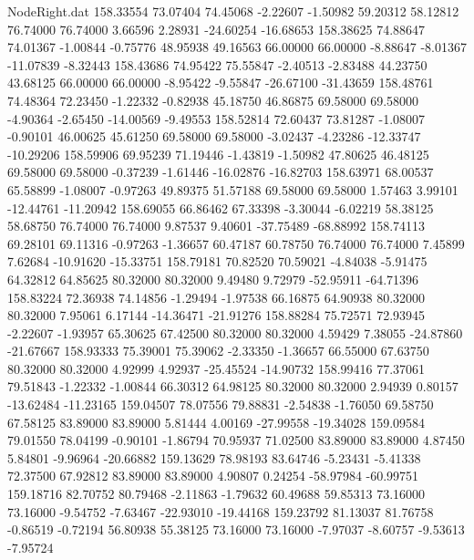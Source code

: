 \begin{filecontents}{NodeRight.dat}
 158.33554   73.07404   74.45068    -2.22607   -1.50982   59.20312   58.12812   76.74000   76.74000    3.66596    2.28931  -24.60254  -16.68653
 158.38625   74.88647   74.01367    -1.00844   -0.75776   48.95938   49.16563   66.00000   66.00000   -8.88647   -8.01367  -11.07839   -8.32443
 158.43686   74.95422   75.55847    -2.40513   -2.83488   44.23750   43.68125   66.00000   66.00000   -8.95422   -9.55847  -26.67100  -31.43659
 158.48761   74.48364   72.23450    -1.22332   -0.82938   45.18750   46.86875   69.58000   69.58000   -4.90364   -2.65450  -14.00569   -9.49553
 158.52814   72.60437   73.81287    -1.08007   -0.90101   46.00625   45.61250   69.58000   69.58000   -3.02437   -4.23286  -12.33747  -10.29206
 158.59906   69.95239   71.19446    -1.43819   -1.50982   47.80625   46.48125   69.58000   69.58000   -0.37239   -1.61446  -16.02876  -16.82703
 158.63971   68.00537   65.58899    -1.08007   -0.97263   49.89375   51.57188   69.58000   69.58000    1.57463    3.99101  -12.44761  -11.20942
 158.69055   66.86462   67.33398    -3.30044   -6.02219   58.38125   58.68750   76.74000   76.74000    9.87537    9.40601  -37.75489  -68.88992
 158.74113   69.28101   69.11316    -0.97263   -1.36657   60.47187   60.78750   76.74000   76.74000    7.45899    7.62684  -10.91620  -15.33751
 158.79181   70.82520   70.59021    -4.84038   -5.91475   64.32812   64.85625   80.32000   80.32000    9.49480    9.72979  -52.95911  -64.71396
 158.83224   72.36938   74.14856    -1.29494   -1.97538   66.16875   64.90938   80.32000   80.32000    7.95061    6.17144  -14.36471  -21.91276
 158.88284   75.72571   72.93945    -2.22607   -1.93957   65.30625   67.42500   80.32000   80.32000    4.59429    7.38055  -24.87860  -21.67667
 158.93333   75.39001   75.39062    -2.33350   -1.36657   66.55000   67.63750   80.32000   80.32000    4.92999    4.92937  -25.45524  -14.90732
 158.99416   77.37061   79.51843    -1.22332   -1.00844   66.30312   64.98125   80.32000   80.32000    2.94939    0.80157  -13.62484  -11.23165
 159.04507   78.07556   79.88831    -2.54838   -1.76050   69.58750   67.58125   83.89000   83.89000    5.81444    4.00169  -27.99558  -19.34028
 159.09584   79.01550   78.04199    -0.90101   -1.86794   70.95937   71.02500   83.89000   83.89000    4.87450    5.84801   -9.96964  -20.66882
 159.13629   78.98193   83.64746    -5.23431   -5.41338   72.37500   67.92812   83.89000   83.89000    4.90807    0.24254  -58.97984  -60.99751
 159.18716   82.70752   80.79468    -2.11863   -1.79632   60.49688   59.85313   73.16000   73.16000   -9.54752   -7.63467  -22.93010  -19.44168
 159.23792   81.13037   81.76758    -0.86519   -0.72194   56.80938   55.38125   73.16000   73.16000   -7.97037   -8.60757   -9.53613   -7.95724

\end{filecontents}
